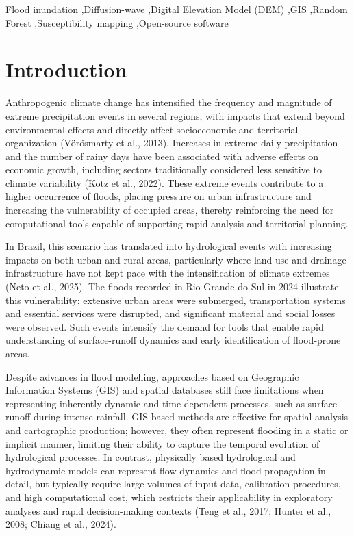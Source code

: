 \documentclass[a4paper,fleqn]{cas-sc}
\begin{document}
\begin{keywords}
Flood inundation \sep Diffusion-wave \sep Digital Elevation Model (DEM) \sep GIS \sep Random Forest \sep Susceptibility mapping \sep Open-source software
\end{keywords}

\maketitle

\section{Introduction}\label{sec:introduction}
Anthropogenic climate change has intensified the frequency and magnitude of extreme precipitation events in several regions, with impacts that extend beyond environmental effects and directly affect socioeconomic and territorial organization (V\"or\"osmarty et al., 2013). Increases in extreme daily precipitation and the number of rainy days have been associated with adverse effects on economic growth, including sectors traditionally considered less sensitive to climate variability (Kotz et al., 2022). These extreme events contribute to a higher occurrence of floods, placing pressure on urban infrastructure and increasing the vulnerability of occupied areas, thereby reinforcing the need for computational tools capable of supporting rapid analysis and territorial planning.

In Brazil, this scenario has translated into hydrological events with increasing impacts on both urban and rural areas, particularly where land use and drainage infrastructure have not kept pace with the intensification of climate extremes (Neto et al., 2025). The floods recorded in Rio Grande do Sul in 2024 illustrate this vulnerability: extensive urban areas were submerged, transportation systems and essential services were disrupted, and significant material and social losses were observed. Such events intensify the demand for tools that enable rapid understanding of surface-runoff dynamics and early identification of flood-prone areas.

Despite advances in flood modelling, approaches based on Geographic Information Systems (GIS) and spatial databases still face limitations when representing inherently dynamic and time-dependent processes, such as surface runoff during intense rainfall. GIS-based methods are effective for spatial analysis and cartographic production; however, they often represent flooding in a static or implicit manner, limiting their ability to capture the temporal evolution of hydrological processes. In contrast, physically based hydrological and hydrodynamic models can represent flow dynamics and flood propagation in detail, but typically require large volumes of input data, calibration procedures, and high computational cost, which restricts their applicability in exploratory analyses and rapid decision-making contexts (Teng et al., 2017; Hunter et al., 2008; Chiang et al., 2024).
\end{document}
